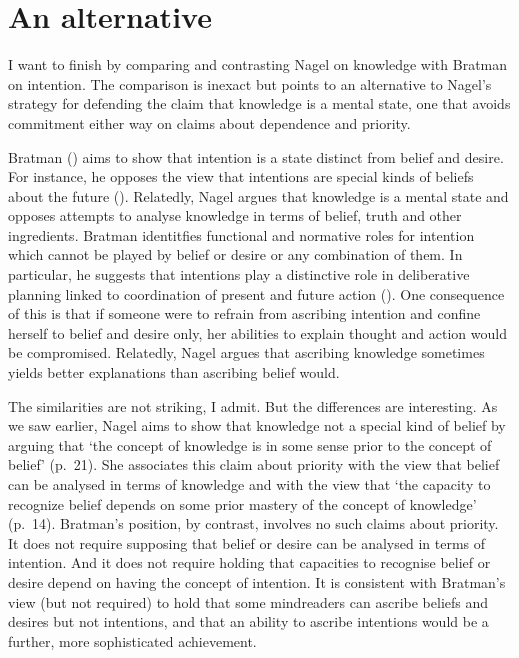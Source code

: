 \documentclass[12pt,\papersize]{extarticle}
\begin{document}
\section{An alternative}
I want to finish by
comparing and contrasting
Nagel on knowledge
with 
Bratman on intention.
The comparison is inexact but points to an alternative to Nagel's strategy for defending the claim that knowledge is a mental state,
one that avoids commitment either way on claims about dependence and priority.


Bratman
(\citeyear{bratman_faces_1999,Bratman:1987xw})
aims to show that intention is a state distinct from  belief and desire.
For instance, he opposes the view that intentions are special kinds of beliefs about the future (\citeyear[pp.\ 257ff]{bratman_faces_1999}).
Relatedly, Nagel argues that knowledge is a mental 
 state and
opposes attempts to analyse knowledge in terms of belief, truth and other ingredients.
Bratman identitfies functional and normative roles for intention which cannot be played by belief or desire or any combination of them.
In particular, he suggests that intentions play a distinctive role in deliberative planning linked to coordination of present and future action
(\citeyear[p.\ 223]{bratman_faces_1999}).
One consequence of this is that if someone were to refrain from ascribing intention and confine herself to belief and desire only, her abilities to explain thought and action would be compromised.
Relatedly, Nagel argues that ascribing knowledge sometimes yields  better explanations than ascribing belief would.

The similarities are not striking, I admit.
But the differences are interesting.
As we saw earlier,
Nagel aims to show that knowledge not a special kind of belief by arguing that `the concept of knowledge is in some sense prior to the concept of belief' (p.\ 21).
She associates this 
claim about priority 
with the view 
that belief can be analysed in terms of knowledge 
and with the view
that `the capacity to recognize belief depends on some prior mastery of the concept of knowledge' (p.\ 14).
Bratman's position, 
by contrast, 
involves no such claims about priority.
It does not require supposing that belief or desire can be analysed in terms of intention.
And it does not require holding that capacities to recognise belief or desire depend on having the concept of intention.
It is consistent with Bratman's view 
(but not required) 
to hold that 
some mindreaders can ascribe beliefs and desires but not intentions,
and that 
an ability to ascribe intentions would be a further, more sophisticated achievement.
\end{document}
